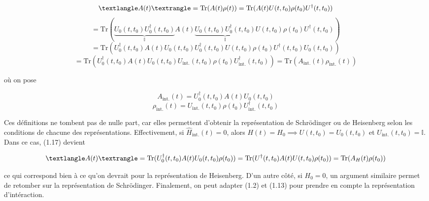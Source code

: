 \begin{equation*}
    \textlangle A(t)\textrangle = \text{Tr}(A(t)\rho(t)) = \text{Tr}(A(t)U(t,t_0)\rho(t_0)U^\dagger(t,t_0))
\end{equation*}
\begin{equation*}
    = \text{Tr}(\underbrace{U_0(t,t_0)U^\dagger_0(t,t_0)}_\text{$\mathbb{I}$}A(t)\underbrace{U_0(t,t_0)U^\dagger_0(t,t_0)}_\text{$\mathbb{I}$}U(t,t_0)\rho(t_0)U^\dagger(t,t_0))
\end{equation*}
\begin{equation*}
    = \text{Tr}(U^\dagger_0(t,t_0)A(t)U_0(t,t_0)U^\dagger_0(t,t_0)U(t,t_0)\rho(t_0)U^\dagger(t,t_0)U_0(t,t_0))
\end{equation*}
\begin{equation}
    = \text{Tr}(U^\dagger_0(t,t_0)A(t)U_0(t,t_0)U_{\text{int.}}(t,t_0)\rho(t_0)U^\dagger_{\text{int.}}(t,t_0)) = \text{Tr}\left(A_\text{int.}(t)\rho_\text{int.}(t)\right)
\end{equation}

où on pose 

\begin{equation}
    A_\text{int.}(t) = U^\dagger_0(t,t_0)A(t)U_0(t,t_0) 
\end{equation}
\begin{equation}
    \rho_\text{int.}(t) = U_{\text{int.}}(t,t_0)\rho(t_0)U^\dagger_{\text{int.}}(t,t_0)
\end{equation}

Ces définitions ne tombent pas de nulle part, car elles permettent d'obtenir la représentation de Schrödinger ou de Heisenberg selon les conditions de chacune des représentations. Effectivement, si $\hat{H}_\text{int.}(t) = 0$, alors $H(t) = H_0 \implies U(t,t_0) = U_0(t,t_0)$ et $U_\text{int.}(t,t_0) = \mathbb{I}$. Dans ce cas, (1.17) devient

\begin{equation*}
    \textlangle A(t)\textrangle = \text{Tr}(U^\dagger_0(t,t_0)A(t)U_0(t,t_0)\rho(t_0)) = \text{Tr}(U^\dagger(t,t_0)A(t)U(t,t_0)\rho(t_0)) = \text{Tr}(A_H(t)\rho(t_0))   
\end{equation*}

ce qui correspond bien à ce qu'on devrait pour la représentation de Heisenberg. D'un autre côté, si $H_0 = 0$, un argument similaire permet de retomber sur la représentation de Schrödinger. Finalement, on peut adapter (1.2) et (1.13) pour prendre en compte la représentation d'intéraction.





